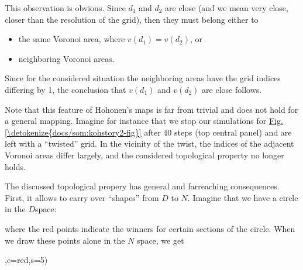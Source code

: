 \documentclass[letterpaper,10pt,english]{jupyterBook}
\begin{document}
\sphinxAtStartPar
This observation is obvious. Since \(d_1\) and \(d_2\) are close (and we mean very close, closer than the resolution of the grid), then they must belong either to
\begin{itemize}
\item {} 
\sphinxAtStartPar
the same Voronoi area, where \(v(d_1)=v(d_2)\), or

\item {} 
\sphinxAtStartPar
neighboring Voronoi areas.

\end{itemize}

\sphinxAtStartPar
Since for the considered situation the neighboring areas have the grid indices differing by 1, the conclusion that \(v(d_1)\) and \(v(d_2)\) are close follows.

\sphinxAtStartPar
Note that this feature of Hohonen’s maps is far from trivial and does not hold for a general mapping. Imagine for instance that we stop our simulations for \hyperref[\detokenize{docs/som:kohstory2-fig}]{Fig.\@ \ref{\detokenize{docs/som:kohstory2-fig}}} after 40 steps (top central panel) and are left with a “twisted” grid. In the vicinity of the twist, the indices of the adjacent Voronoi areas differ largely, and the considered topological property no longer holds.

\sphinxAtStartPar
The discussed topological propery has general and far\sphinxhyphen{}reaching consequences. First, it allows to carry over “shapes” from \(D\) to \(N\). Imagine that we have a circle in the \(D\)\sphinxhyphen{}space:

\noindent{}

\sphinxAtStartPar
where the red points indicate the winners for certain sections of the circle. When we draw these points alone in the \(N\) space, we get

\begin{sphinxVerbatim}[commandchars=\\\{\}]


,c=\PYGZsq{}red\PYGZsq{},s=5)

        
\end{sphinxVerbatim}
\end{document}
